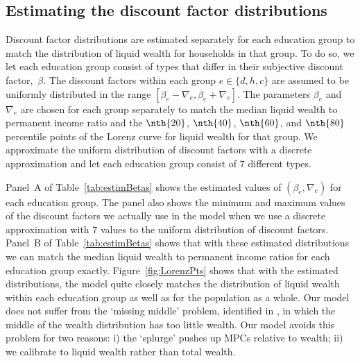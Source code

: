 \documentclass[../HAFiscal]{subfiles}
\begin{document}
\subsection{Estimating the discount factor distributions} 
\label{sec:estimBetas}

Discount factor distributions are estimated separately for each education group to match the distribution of liquid wealth for households in that group. To do so, we let each education group consist of types that differ in their subjective discount factor,~$\beta$. The discount factors within each group $e\in \{d, h, c\}$ are assumed to be uniformly distributed in the range $[\beta_e-\nabla_e, \beta_e+\nabla_e]$. The parameters $\beta_e$ and $\nabla_e$ are chosen for each group separately to match the median liquid wealth to permanent income ratio and the $\nth{20}$, $\nth{40}$, $\nth{60}$, and $\nth{80}$ percentile points of the Lorenz curve for liquid wealth for that group. We approximate the uniform distribution of discount factors with a discrete approximation and let each education group consist of $7$ different types.

Panel~A of Table~\ref{tab:estimBetas} shows the estimated values of $(\beta_e, \nabla_e)$ for each education group. The panel also shows the minimum and maximum values of the discount factors we actually use in the model when we use a discrete approximation with $7$ values to the uniform distribution of discount factors. Panel~B of Table~\ref{tab:estimBetas} shows that with these estimated distributions we can match the median liquid wealth to permanent income ratios for each education group exactly. Figure~\ref{fig:LorenzPts} shows that with the estimated distributions, the model quite closely matches the distribution of liquid wealth within each education group as well as for the population as a whole. Our model does not suffer from the `missing middle' problem, identified in \cite{kaplanMPC2022}, in which the middle of the wealth distribution has too little wealth.  Our model avoids this problem for two reasons: i) the `splurge' pushes up MPCs relative to wealth; ii) we calibrate to liquid wealth rather than total wealth.
\end{document}
